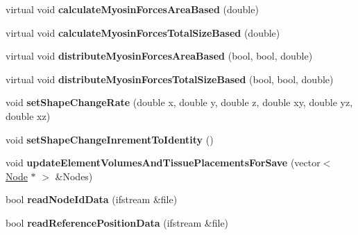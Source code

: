 \begin{DoxyCompactItemize}
\item 
\hypertarget{classShapeBase_a9dd11948f7d61dfb958f6a06b6d6f188}{}virtual void {\bfseries calculate\+Myosin\+Forces\+Area\+Based} (double)\label{classShapeBase_a9dd11948f7d61dfb958f6a06b6d6f188}

\item 
\hypertarget{classShapeBase_a1c188f23e849768430720014077af1dc}{}virtual void {\bfseries calculate\+Myosin\+Forces\+Total\+Size\+Based} (double)\label{classShapeBase_a1c188f23e849768430720014077af1dc}

\item 
\hypertarget{classShapeBase_a639a01fec2bdd88daa071058ced841d3}{}virtual void {\bfseries distribute\+Myosin\+Forces\+Area\+Based} (bool, bool, double)\label{classShapeBase_a639a01fec2bdd88daa071058ced841d3}

\item 
\hypertarget{classShapeBase_aa410e608334905dc972b0c16c3998919}{}virtual void {\bfseries distribute\+Myosin\+Forces\+Total\+Size\+Based} (bool, bool, double)\label{classShapeBase_aa410e608334905dc972b0c16c3998919}

\item 
\hypertarget{classShapeBase_a8a9f91384133d8953dbb38d71cc29d51}{}void {\bfseries set\+Shape\+Change\+Rate} (double x, double y, double z, double xy, double yz, double xz)\label{classShapeBase_a8a9f91384133d8953dbb38d71cc29d51}

\item 
\hypertarget{classShapeBase_adacee19f788f056fe794bde14b934063}{}void {\bfseries set\+Shape\+Change\+Inrement\+To\+Identity} ()\label{classShapeBase_adacee19f788f056fe794bde14b934063}

\item 
\hypertarget{classShapeBase_a6e36c21c648f06a0e0693b3c34472fe5}{}void {\bfseries update\+Element\+Volumes\+And\+Tissue\+Placements\+For\+Save} (vector$<$ \hyperlink{classNode}{Node} $\ast$ $>$ \&Nodes)\label{classShapeBase_a6e36c21c648f06a0e0693b3c34472fe5}

\item 
\hypertarget{classShapeBase_acbd21b1daca4a94c5919147ae8c463d6}{}bool {\bfseries read\+Node\+Id\+Data} (ifstream \&file)\label{classShapeBase_acbd21b1daca4a94c5919147ae8c463d6}

\item 
\hypertarget{classShapeBase_a37a16216b042486dfdcbb16d8366eb7f}{}bool {\bfseries read\+Reference\+Position\+Data} (ifstream \&file)\label{classShapeBase_a37a16216b042486dfdcbb16d8366eb7f}


\end{DoxyCompactItemize}
